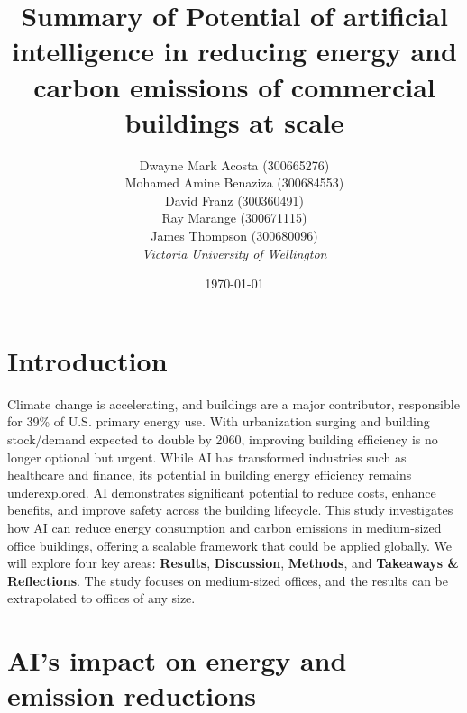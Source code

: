 \documentclass[conference,a4paper]{IEEEtran}
\begin{document}
\newcommand{\cfigure}[2]{%
  \begin{figure}[h]
    \centering
    \texttt{[image: figures/\#1.png]}%
    \caption{#2}%
    \label{fig:#1}%
  \end{figure}%

}
\title{Summary of Potential of artificial intelligence in reducing energy and carbon emissions of commercial buildings at scale}

\author{Dwayne Mark Acosta (300665276) \\ Mohamed Amine Benaziza (300684553) \\ David Franz (300360491) \\ Ray Marange (300671115) \\ James Thompson (300680096)\\
\textit{Victoria University of Wellington}\\}
\date{\today}

\maketitle

\section*{Introduction}
Climate change is accelerating, and buildings are a major contributor, responsible for 39\% of U.S. primary energy use. With urbanization surging and building stock/demand expected to double by 2060, improving building efficiency is no longer optional but urgent.
While AI has transformed industries such as healthcare and finance, its potential in building energy efficiency remains underexplored. AI demonstrates significant potential to reduce costs, enhance benefits, and improve safety across the building lifecycle. This study \cite{dingPotentialArtificialIntelligence2024} investigates how AI can reduce energy consumption and carbon emissions in medium-sized office buildings, offering a scalable framework that could be applied globally.
We will explore four key areas: \textbf{Results}, \textbf{Discussion}, \textbf{Methods}, and \textbf{Takeaways \& Reflections}. The study focuses on medium-sized offices, and the results can be extrapolated to offices of any size.


\section*{AI's impact on energy and emission reductions}
\end{document}
